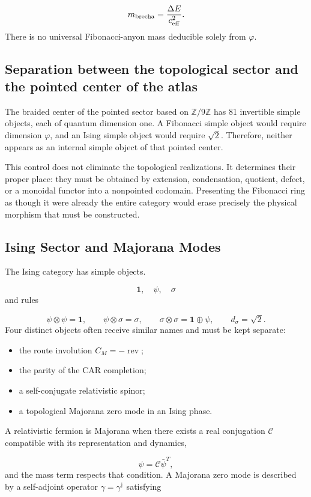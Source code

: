 \[
m_{\rm brecha}=\frac{\Delta E}{c_{\rm eff}^{2}}.
\]
There is no universal Fibonacci-anyon mass deducible solely from \(\varphi\).

\subsection{Separation between the topological sector and the pointed center of the atlas}
The braided center of the pointed sector based on \(\mathbb Z/9\mathbb Z\) has 81 invertible simple objects, each of quantum dimension one. A Fibonacci simple object would require dimension \(\varphi\), and an Ising simple object would require \(\sqrt2\). Therefore, neither appears as an internal simple object of that pointed center.

This control does not eliminate the topological realizations. It determines their proper place: they must be obtained by extension, condensation, quotient, defect, or a monoidal functor into a nonpointed codomain. Presenting the Fibonacci ring as though it were already the entire category would erase precisely the physical morphism that must be constructed.

\subsection{Ising Sector and Majorana Modes}
The Ising category has simple objects.

\[
\mathbf1,\quad\psi,\quad\sigma
\]
and rules

\[
\psi\otimes\psi=\mathbf1,
\qquad
\psi\otimes\sigma=\sigma,
\qquad
\sigma\otimes\sigma=\mathbf1\oplus\psi,
\qquad
d_\sigma=\sqrt2.
\]
Four distinct objects often receive similar names and must be kept separate:

\begin{itemize}
\item the route involution \(C_M=-\operatorname{rev}\);
\item the parity of the CAR completion;
\item a self-conjugate relativistic spinor;
\item a topological Majorana zero mode in an Ising phase.
\end{itemize}
A relativistic fermion is Majorana when there exists a real conjugation \(\mathcal C\) compatible with its representation and dynamics,

\[
\psi=\mathcal C\bar\psi^{T},
\]
and the mass term respects that condition. A Majorana zero mode is described by a self-adjoint operator \(\gamma=\gamma^\dagger\) satisfying

